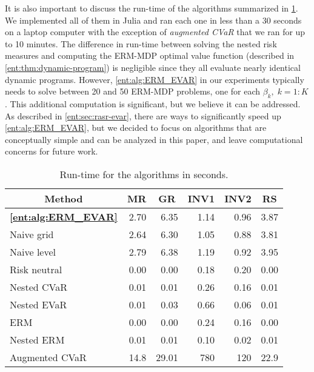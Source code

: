 \documentclass[twoside]{article}
\theoremstyle{plain}
\theoremstyle{definition}
\theoremstyle{remark}
\begin{document}
It is also important to discuss the run-time of the algorithms summarized in \cref{ent:tab:runtime}. We implemented all of them in Julia and ran each one in less than a 30 seconds on a laptop computer with the exception of \emph{augmented CVaR} that we ran for up to 10 minutes. The difference in run-time between solving the nested risk measures and computing the ERM-MDP optimal value function (described in \cref{ent:thm:dynamic-program}) is negligible since they all evaluate nearly identical dynamic programs. However, \cref{ent:alg:ERM_EVAR} in our experiments typically needs to solve between 20 and 50 ERM-MDP problems, one for each $\beta_k,\;k=1{:}K$. This additional computation is significant, but we believe it can be addressed. As described in \cref{ent:sec:rasr-evar}, there are ways to significantly speed up \cref{ent:alg:ERM_EVAR}, but we decided to focus on algorithms that are conceptually simple and can be analyzed in this paper, and leave computational concerns for future work.

\begin{table}
\centering
\caption{Run-time for the algorithms in seconds.} \label{ent:tab:runtime}
\begin{small}
\begin{tabular}{l|rrrrr}
  \toprule
  \multicolumn{1}{c|}{Method} & \multicolumn{1}{c}{MR} & \multicolumn{1}{c}{GR} &  \multicolumn{1}{c}{INV1} & \multicolumn{1}{c}{INV2} & \multicolumn{1}{c}{RS}  \\
  \midrule
  \textbf{\cref{ent:alg:ERM_EVAR}} & 2.70 & 6.35 & 1.14 & 0.96 & 3.87 \\ 
  Naive grid & 2.64 & 6.30 & 1.05 & 0.88 & 3.81 \\ 
  Naive level & 2.79 & 6.38 & 1.19 & 0.92 & 3.95 \\ 
  Risk neutral & 0.00 & 0.00 & 0.18 & 0.20 & 0.00 \\ 
  Nested CVaR & 0.01 & 0.01 & 0.26 & 0.16 & 0.01 \\ 
  Nested EVaR & 0.01 & 0.03 & 0.66 & 0.06 & 0.01 \\ 
  ERM & 0.00 & 0.00 & 0.24 & 0.16 & 0.00 \\ 
  Nested ERM & 0.01 & 0.01 & 0.10 & 0.02 & 0.01 \\ 
  \midrule
  Augmented CVaR & 14.8  & 29.01 & 780 & 120 & 22.9 \\
  \bottomrule
\end{tabular}
\end{small}
\end{table}
\end{document}
